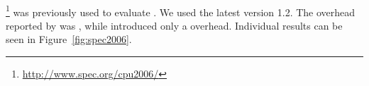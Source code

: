 \paragraph{\speczerosix}\footnote{\url{http://www.spec.org/cpu2006/}}
was previously used to evaluate \mx. We used the latest version 1.2.  The
overhead reported by \mx was \mxSpec, while \varan introduced only
a \speczerosixOneFollower overhead.
Individual results can be seen in Figure~\ref{fig:spec2006}.  




